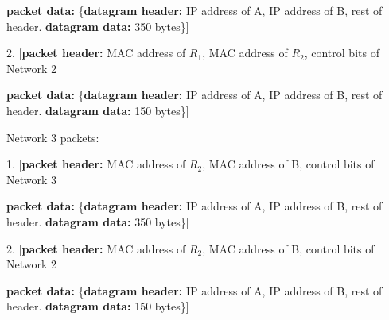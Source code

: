 \documentclass[paper=a4, fontsize=11pt]{scrartcl} %
\numberwithin{equation}{section} %
\numberwithin{figure}{section} %
\numberwithin{table}{section} %
\begin{document}
\textbf{packet data:} \{\textbf{datagram header:} IP address of A, IP address of B, rest of header. \textbf{datagram data:} 350 bytes\}]

2. [\textbf{packet header:} MAC address of $R_1$, MAC address of $R_2$, control bits of Network 2

\textbf{packet data:} \{\textbf{datagram header:} IP address of A, IP address of B, rest of header. \textbf{datagram data:} 150 bytes\}]

\bigskip
Network 3 packets: 

1. [\textbf{packet header:} MAC address of $R_2$, MAC address of B, control bits of Network 3

\textbf{packet data:} \{\textbf{datagram header:} IP address of A, IP address of B, rest of header. \textbf{datagram data:} 350 bytes\}]

2. [\textbf{packet header:} MAC address of $R_2$, MAC address of B, control bits of Network 2

\textbf{packet data:} \{\textbf{datagram header:} IP address of A, IP address of B, rest of header. \textbf{datagram data:} 150 bytes\}]
\end{document}
